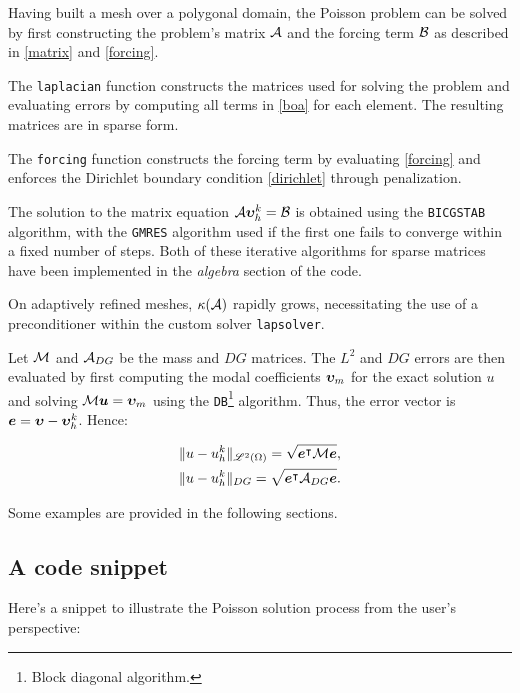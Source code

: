 Having built a mesh over a polygonal domain, the Poisson problem can be solved by first constructing the problem's matrix $\mathcal{A}$ and the forcing term $\mathcal{B}$ as described in \eqref{matrix} and \eqref{forcing}.

The \lstinline{laplacian} function constructs the matrices used for solving the problem and evaluating errors by computing all terms in \eqref{boa} for each element. The resulting matrices are in sparse form.

The \lstinline{forcing} function constructs the forcing term by evaluating \eqref{forcing} and enforces the Dirichlet boundary condition \eqref{dirichlet} through penalization.

\cite{Saad2003} The solution to the matrix equation $\mathcal{A} \bm{\upsilon}^k_h = \mathcal{B}$ is obtained using the \lstinline{BICGSTAB} algorithm, with the \lstinline{GMRES} algorithm used if the first one fails to converge within a fixed number of steps. Both of these iterative algorithms for sparse matrices have been implemented in the \textit{algebra} section of the code.

On adaptively refined meshes, $\kappa(\mathcal{A})$ rapidly grows, necessitating the use of a preconditioner within the custom solver \lstinline{lapsolver}.

Let $\mathcal{M}$ and $\mathcal{A}_{DG}$ be the mass and $DG$ matrices. The $L^2$ and $DG$ errors are then evaluated by first computing the modal coefficients $\bm{\upsilon}_m$ for the exact solution $u$ and solving $\mathcal{M} \bm{u} = \bm{\upsilon}_m$ using the \lstinline{DB}\footnote{Block diagonal algorithm.} algorithm. Thus, the error vector is $\bm{e} = \bm{\upsilon} - \bm{\upsilon}^k_h$. Hence:

\begin{gather}
    \lVert u - u^k_h \rVert_{\mathscr{L}^2(\Omega)} = \sqrt{\bm{e}^\intercal \mathcal{M} \bm{e}}, \\
    \lVert u - u^k_h \rVert_{DG} = \sqrt{\bm{e}^\intercal \mathcal{A}_{DG} \bm{e}}.
\end{gather}

Some examples are provided in the following sections.

\newpage
\subsection{A code snippet}

Here's a snippet to illustrate the Poisson solution process from the user's perspective:

